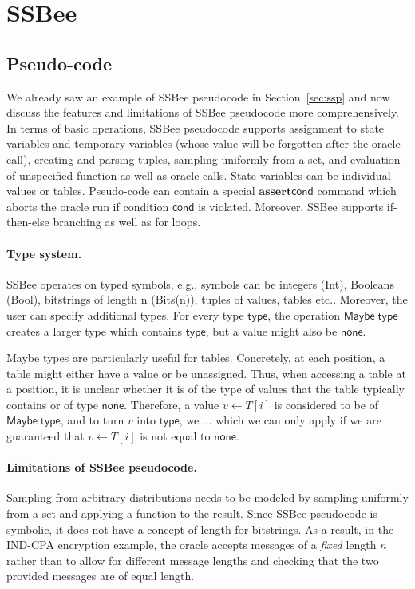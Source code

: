 \section{SSBee}
\subsection{Pseudo-code}
We already saw an example of SSBee pseudocode in Section~\ref{sec:ssp} and now discuss the features and limitations of SSBee pseudocode more comprehensively.
In terms of basic operations, SSBee pseudocode supports assignment to state variables and temporary variables (whose value will be forgotten after the oracle call), creating and parsing tuples, sampling uniformly from a set, and evaluation of unspecified function as well as oracle calls. State variables can be individual values or tables. Pseudo-code can contain a special $\mathbf{assert}\mathsf{ cond}$ command which aborts the oracle run if condition $\mathsf{cond}$ is violated. Moreover, SSBee supports if-then-else branching as well as for loops.

\paragraph{Type system.}
SSBee operates on typed symbols, e.g., symbols can be integers (Int),
Booleans (Bool), bitstrings of length n (Bits(n)), tuples of values,
tables etc.. Moreover, the user can specify additional types. For 
every type $\mathsf{type}$, the operation $\mathsf{Maybe}\;\mathsf{type}$
creates a larger type which contains $\mathsf{type}$, but a value
might also be $\mathsf{none}$.

Maybe types are particularly useful for tables. Concretely, at each position, a table might either have a value or be unassigned. Thus, when accessing a table at a position, it is unclear whether it is of the type of values that the table typically contains or of type $\mathsf{none}$. Therefore, a value $v\leftarrow T[i]$ is considered to be of $\mathsf{Maybe}\;\mathsf{type}$, and to turn $v$ into $\mathsf{type}$, we ... which we can only apply if we are guaranteed that $v\leftarrow T[i]$ is not 
equal to $\mathsf{none}$.

\paragraph{Limitations of SSBee pseudocode.}
Sampling from arbitrary distributions needs to be modeled by sampling uniformly from
a set and applying a function to the result. Since SSBee pseudocode is symbolic, it
does not have a concept of length for bitstrings. As a result, in the IND-CPA encryption example, the oracle accepts messages of a \emph{fixed} length $n$ rather
than to allow for different message lengths and checking that the two provided messages are of equal length.

